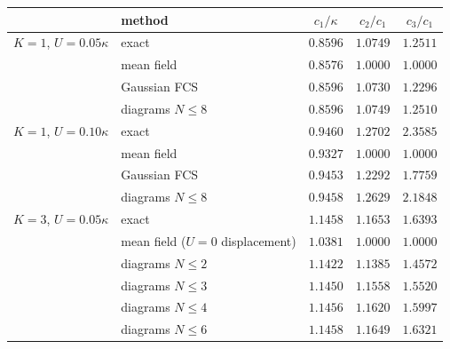 \begin{tabular}{llccc}
 & method & $c_1/\kappa$ & $c_2/c_1$ & $c_3/c_1$ \\ \hline
$K=1$, $U=0.05\kappa$   & exact                             & $0.8596$ & $1.0749$ & $1.2511$ \\
                        & mean field                        & $0.8576$ & $1.0000$ & $1.0000$ \\
                        & Gaussian FCS                      & $0.8596$ & $1.0730$ & $1.2296$ \\
                        & diagrams $N\leq8$                 & $0.8596$ & $1.0749$ & $1.2510$ \\[2pt]
$K=1$, $U=0.10\kappa$   & exact                             & $0.9460$ & $1.2702$ & $2.3585$ \\
                        & mean field                        & $0.9327$ & $1.0000$ & $1.0000$ \\
                        & Gaussian FCS                      & $0.9453$ & $1.2292$ & $1.7759$ \\
                        & diagrams $N\leq8$                 & $0.9458$ & $1.2629$ & $2.1848$ \\[2pt]
$K=3$, $U=0.05\kappa$   & exact                             & $1.1458$ & $1.1653$ & $1.6393$ \\
                        & mean field ($U=0$ displacement)   & $1.0381$ & $1.0000$ & $1.0000$ \\
                        & diagrams $N\leq2$                 & $1.1422$ & $1.1385$ & $1.4572$ \\
                        & diagrams $N\leq3$                 & $1.1450$ & $1.1558$ & $1.5520$ \\
                        & diagrams $N\leq4$                 & $1.1456$ & $1.1620$ & $1.5997$ \\
                        & diagrams $N\leq6$                 & $1.1458$ & $1.1649$ & $1.6321$ \\
\end{tabular}
